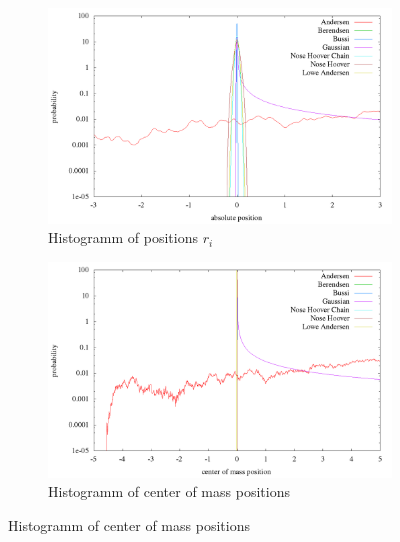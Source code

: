 \begin{figure}[H]
\centering
  \begin{subfigure}[b]{0.5\textwidth}
  	\includegraphics[width=\linewidth]{./graphics/Histogramm_absPosition_rand_T=20_p=64.png}
  	\caption{Histogramm of positions $r_i$}
    \label{im:absPos_rand}
  \end{subfigure}\hfill
  \begin{subfigure}[b]{0.5\textwidth}
    \includegraphics[width=\linewidth]{./graphics/Histogramm_schwerPos_rand_T=20_p=64.png}
    \caption{Histogramm of center of mass positions}
    \label{im:schwerPos_rand}
  \end{subfigure}
\label{fig:pos_rand}
\end{figure}




